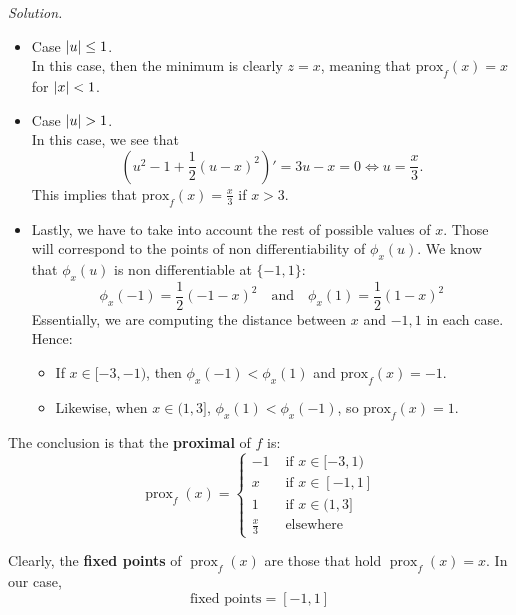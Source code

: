 \documentclass[a4paper]{article}
\DeclarePairedDelimiter\abs{\lvert}{\rvert}%
\newenvironment{solution}
    {\textit{Solution.}\\}
    {}
\begin{document}
\begin{solution}
  \begin{itemize}
    \item Case \(\abs{u} \leq 1\).\\
          In this case, then the minimum is clearly \(z = x\), meaning that \(\text{prox}_f(x) = x\) for \(\abs{x}<1\).

    \item Case \(\abs{u} > 1\).\\
          In this case, we see that
          \[
            \left(u^2 - 1 + \frac{1}{2}(u-x)^2\right)' = 3u - x = 0 \Longleftrightarrow u = \frac{x}{3}.
          \]
          This implies that \(\text{prox}_f(x) = \frac{x}{3}\) if \(x > 3\).

    \item Lastly, we have to take into account the rest of possible values of \(x\). Those will correspond to the points of non differentiability of \(\phi_x(u)\). We know that \(\phi_x(u)\) is non differentiable at \(\{-1,1\}\):
          \[
            \phi_x(-1) = \frac{1}{2}(-1-x)^2 \quad \text{and} \quad \phi_x(1) = \frac{1}{2}(1-x)^2
          \]
          Essentially, we are computing the distance between \(x\) and \(-1,1\) in each case. Hence:
          \begin{itemize}
            \item  If \(x \in [-3,-1)\),  then \(\phi_x(-1) < \phi_x(1)\) and \(\text{prox}_f(x) = -1 \).
            \item Likewise, when \(x \in (1,3]\), \(\phi_x(1) < \phi_x(-1)\), so \(\text{prox}_f(x) = 1\).
          \end{itemize}
  \end{itemize}

  The conclusion is that the \textbf{proximal} of \(f\) is:
  \[
    \operatorname{prox}_f(x) = \begin{cases}
      -1          & \text{ if } x \in [-3,1) \\
      x           & \text{ if } x \in [-1,1] \\
      1           & \text{ if } x \in (1,3]  \\
      \frac{x}{3} & \text{ elsewhere }
    \end{cases}
  \]

  Clearly, the \textbf{fixed points} of \(\operatorname{prox}_f(x)\) are those that hold \(\operatorname{prox}_f(x) = x\). In our case,
  \[
    \text{fixed points} = [-1,1]
  \]
\end{solution}
\end{document}
